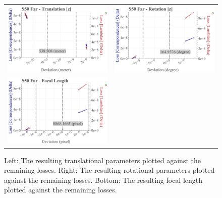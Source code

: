 \begin{figure}[!ht]
\begin{tabular}{cc}
    \includegraphics[width=0.45 \linewidth]{diagrams/calibration/s50_s_far/parameters.csv/Translation[z]_vs_Loss[Correspondences]_vs_Loss[Lambdas]_cluster_All.png} &
    \includegraphics[width=0.45 \linewidth]{diagrams/calibration/s50_s_far/parameters.csv/Rotation[z]_vs_Loss[Correspondences]_vs_Loss[Lambdas]_cluster_All.png} \\

    \includegraphics[width=0.45 \linewidth]{diagrams/calibration/s50_s_far/parameters.csv/FocalLength_vs_Loss[Correspondences]_vs_Loss[Lambdas]_cluster_All.png} &

  \end{tabular}
\caption{
  Left: The resulting translational parameters plotted against the remaining losses. 
  Right: The resulting rotational parameters plotted against the remaining losses.
  Bottom: The resulting focal length  plotted against the remaining losses.
    }
\label{fig:static_calibration_algorithmic_error_s50_s_far}
\end{figure}

